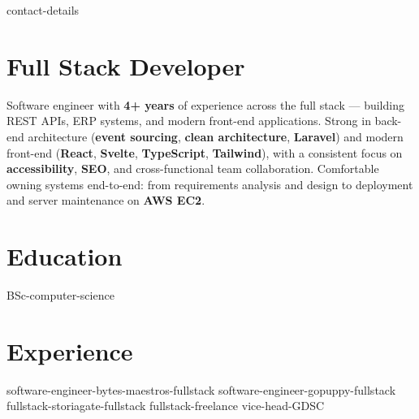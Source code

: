 \documentclass[a4paper,11pt]{article}
\newcommand{\resumeHeadingListStart}{
  \begin{itemize}[leftmargin=0.15in, label={}]
}
\newcommand{\resumeHeadingListEnd}{\end{itemize}}
\begin{document}

{contact-details}



\section{Full Stack Developer}
\small{
  Software engineer with \textbf{4+ years} of experience across the full stack —
  building REST APIs, ERP systems, and modern front-end applications.
  Strong in back-end architecture (\textbf{event sourcing}, \textbf{clean architecture},
  \textbf{Laravel}) and modern front-end (\textbf{React}, \textbf{Svelte}, \textbf{TypeScript},
  \textbf{Tailwind}), with a consistent focus on \textbf{accessibility},
  \textbf{SEO}, and cross-functional team collaboration.
  Comfortable owning systems end-to-end: from requirements analysis and
  design to deployment and server maintenance on \textbf{AWS EC2}.
}


\section{Education}
  \resumeHeadingListStart{}
    {BSc-computer-science}
  \resumeHeadingListEnd{}


\section{Experience}
\resumeHeadingListStart{}
  {software-engineer-bytes-maestros-fullstack}
  {software-engineer-gopuppy-fullstack}
  {fullstack-storiagate-fullstack}
  {fullstack-freelance}
  {vice-head-GDSC}
\resumeHeadingListEnd{}
\end{document}
